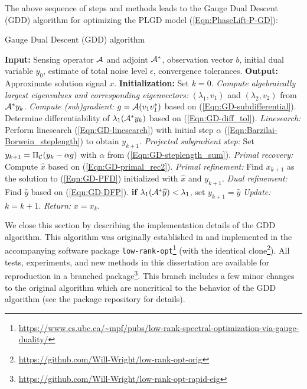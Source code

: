 The above sequence of steps and methods leads to the Gauge Dual Descent (GDD) algorithm for optimizing the PLGD model  (\ref{Eqn:PhaseLift-P-GD}):
\begin{algorithm}[H]
\caption{Gauge Dual Descent (GDD) algorithm} 	\label{Alg:PGD}

\begin{algorithmic}[1]
	\Statex 	\textbf{Input:} Sensing operator ${\mathcal A}$ and adjoint ${\mathcal A}^*$, observation vector $b$,
	initial dual variable $y_0$, estimate of total noise level $\epsilon$,  convergence
	tolerances.
	\Statex 	\textbf{Output:} Approximate solution signal $x$.
	\Statex		\textbf{Initialization:} Set $k = 0$.
		\State 		\textit{Compute algebraically largest eigenvalues and corresponding eigenvectors:} $(\lambda_1, v_1)$ and  $(\lambda_2, v_2)$ from ${\mathcal A}^*y_k$.
		\State 		\textit{Compute (sub)gradient:} $g = {\mathcal A}(v_1 v_1^*)$ based on  (\ref{Eqn:GD-subdifferential}).
		\State		Determine differentiability of $\lambda_1({\mathcal A}^*y_k)$ based on (\ref{Eqn:GD-diff_tol}).
			\State		\textit{Linesearch:} Perform linesearch (\ref{Eqn:GD-linesearch}) with initial step $\alpha$ (\ref{Eqn:Barzilai-Borwein_steplength}) to obtain $y_{k+1}$.	
		\Else
			\State		\textit{Projected subgradient step:} Set $y_{k+1} = \Pi_{\mathcal C} (y_k - \alpha g)$ with $\alpha$ from (\ref{Eqn:GD-steplength_sum}).
		\EndIf
		\State		\textit{Primal recovery:} Compute $\hat{x}$ based on (\ref{Eqn:GD-primal_rec2}).
		\State		\textit{Primal refinement:} Find $x_{k+1}$ as the solution to (\ref{Eqn:GD-PFD}) initialized with $\hat{x}$ and $y_{k+1}$.
		 {}
			\State		\textit{Dual refinement:} Find $\widehat{y}$ based on (\ref{Eqn:GD-DFP}).
			\State		\textbf{if} $\lambda_1({\mathcal A}^* \widehat{y}) < \lambda_1$, set $y_{k+1} = \widehat{y}$
		\EndIf
			\State	\textit{Update:} $k = k+1$.
	\EndWhile
	\State	\textit{Return:} $x = x_k$. 
\end{algorithmic}

\end{algorithm}





We close this section by describing the implementation details of the GDD algorithm.  
This algorithm was originally established in \cite{DBLP:journals/siamsc/FriedlanderM16} and implemented in the accompanying software package \texttt{low-rank-opt}\footnote{\url{https://www.cs.ubc.ca/~mpf/pubs/low-rank-spectral-optimization-via-gauge-duality/}} (with the identical clone\footnote{\url{https://github.com/Will-Wright/low-rank-opt-orig}}).  
All tests, experiments, and new methods in this dissertation are available for reproduction in a branched package\footnote{\url{https://github.com/Will-Wright/low-rank-opt-rapid-eig}}.  
This branch includes a few minor changes to the original algorithm which are noncritical to the behavior of the GDD algorithm (see the package repository for details).


